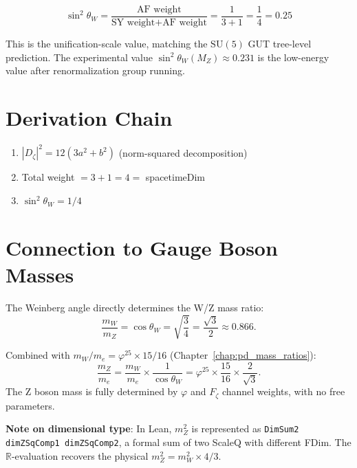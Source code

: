 \begin{theorem}
\label{thm:weinberg_formula}
\leanok
\[
\sin^2\theta_W = \frac{\text{AF weight}}{\text{SY weight} + \text{AF weight}}
= \frac{1}{3 + 1} = \frac{1}{4} = 0.25
\]
\end{theorem}

This is the unification-scale value, matching the $\mathrm{SU}(5)$ GUT tree-level prediction.
The experimental value $\sin^2\theta_W(M_Z) \approx 0.231$ is the low-energy value
after renormalization group running.

\section{Derivation Chain}
\label{sec:weinberg_derivation}

\begin{theorem}
\label{thm:weinberg_from_channels}
\leanok
\begin{enumerate}
\item $|D_\zeta|^2 = 12(3a^2 + b^2)$ (norm-squared decomposition)
\item Total weight $= 3 + 1 = 4 =$ spacetimeDim
\item $\sin^2\theta_W = 1/4$
\end{enumerate}
\end{theorem}

\section{Connection to Gauge Boson Masses}
\label{sec:weinberg_gauge_mass}

The Weinberg angle directly determines the W/Z mass ratio:
\[
\frac{m_W}{m_Z} = \cos\theta_W = \sqrt{\frac{3}{4}} = \frac{\sqrt{3}}{2} \approx 0.866.
\]

Combined with $m_W/m_e = \varphi^{25} \times 15/16$ (Chapter~\ref{chap:pd_mass_ratios}):
\[
\frac{m_Z}{m_e} = \frac{m_W}{m_e} \times \frac{1}{\cos\theta_W}
= \varphi^{25} \times \frac{15}{16} \times \frac{2}{\sqrt{3}}.
\]
The Z boson mass is fully determined by $\varphi$ and $F_\zeta$ channel weights,
with no free parameters.

\textbf{Note on dimensional type}: In Lean, $m_Z^2$ is represented as \texttt{DimSum2 dimZSqComp1 dimZSqComp2},
a formal sum of two ScaleQ with different FDim.
The $\mathbb{R}$-evaluation recovers the physical $m_Z^2 = m_W^2 \times 4/3$.

